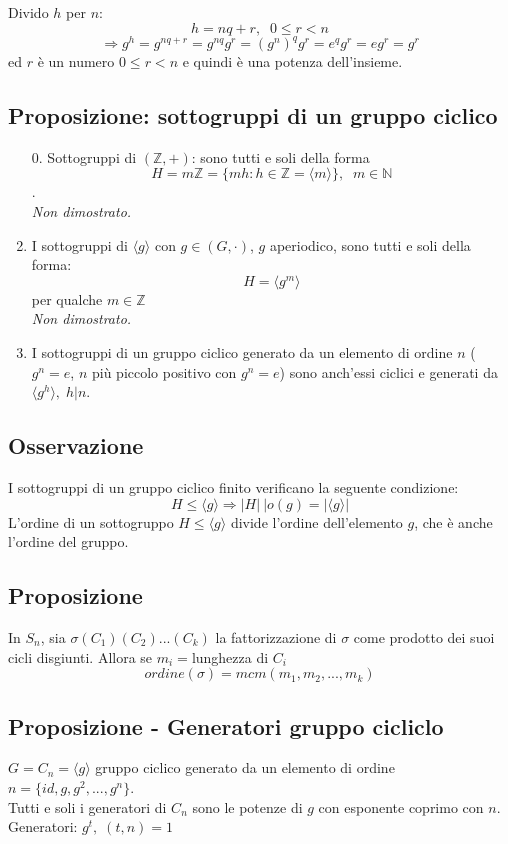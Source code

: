 Divido \(h\) per \(n\):
\[h=nq+r,\;\;0\leq r<n\]
\[\Rightarrow g^h=g^{nq+r}=g^{nq}g^r=(g^n)^qg^r=e^qg^r=eg^r=g^r\]
ed \(r\) è un numero \(0\leq r<n\) e quindi è una potenza dell'insieme.

\subsection{Proposizione: sottogruppi di un gruppo ciclico}
\begin{enumerate}
	
	\item[0.] Sottogruppi di \((\mathbb{Z},+)\): sono tutti e soli della forma \[H=m\mathbb{Z}=\{mh:h\in\mathbb{Z}=\langle m\rangle\},\;\;m\in\mathbb{N}\].
	\\\textit{Non dimostrato.}

	\item I sottogruppi di \(\langle g\rangle\) con \(g\in (G,\cdot)\), \(g\) aperiodico, sono tutti e soli della forma:
	\[H=\langle g^m\rangle\]
	per qualche \(m\in\mathbb{Z}\)
	\\\textit{Non dimostrato.}

	\item I sottogruppi di un gruppo ciclico generato da un elemento di ordine \(n\) (\(g^n=e\), \(n\) più piccolo positivo con \(g^n=e\)) sono anch'essi ciclici e generati da \(\langle g^h\rangle,\; h|n\).

\end{enumerate}

\subsection{Osservazione}
I sottogruppi di un gruppo ciclico finito verificano la seguente condizione:
\[H\leq\langle g\rangle\Rightarrow\vert H|\:| o(g)=|\langle g\rangle|\]
L'ordine di un sottogruppo \(H\leq\langle g\rangle\) divide l'ordine dell'elemento \(g\), che è anche l'ordine del gruppo.

\subsection{Proposizione}
In \(S_n\), sia \(\sigma (C_1)(C_2)...(C_k)\) la fattorizzazione di \(\sigma\) come prodotto dei suoi cicli disgiunti. Allora se \(m_i=\)lunghezza di \(C_i\)
\[ordine(\sigma)=mcm(m_1,m_2,...,m_k)\]

\subsection{Proposizione - Generatori gruppo cicliclo}
\(G=C_n=\langle g\rangle\) gruppo ciclico generato da un elemento di ordine \(n=\{id,g,g^2,...,g^n\}\). 
\\Tutti e soli i generatori di \(C_n\) sono le potenze di \(g\) con esponente coprimo con \(n\).
\\Generatori: \(g^t,\;(t,n)=1\)

